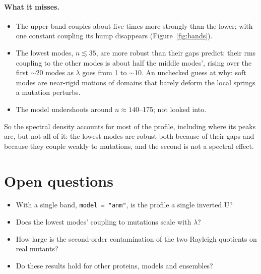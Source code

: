 \documentclass[11pt]{article}
\newcommand{\code}[1]{\texttt{#1}}
\begin{document}
\paragraph{What it misses.}
\begin{itemize}
\item The upper band couples about five times more strongly than the lower; with one constant
  coupling its hump disappears (Figure~\ref{fig:bands}).
\item The lowest modes, $n\lesssim35$, are more robust than their gaps predict: their rms
  coupling to the other modes is about half the middle modes', rising over the first $\sim$20
  modes as $\lambda$ goes from 1 to $\sim$10. An unchecked guess at why: soft modes are near-rigid
  motions of domains that barely deform the local springs a mutation perturbs.
\item The model undershoots around $n\approx140$--175; not looked into.
\end{itemize}

So the spectral density accounts for most of the profile, including where its peaks are, but
not all of it: the lowest modes are robust both because of their gaps and because they couple
weakly to mutations, and the second is not a spectral effect.

\section{Open questions}

\begin{itemize}
\item With a single band, \code{model = "anm"}, is the profile a single inverted U?
\item Does the lowest modes' coupling to mutations scale with $\lambda$?
\item How large is the second-order contamination of the two Rayleigh quotients on real mutants?
\item Do these results hold for other proteins, models and ensembles?
\end{itemize}
\end{document}
